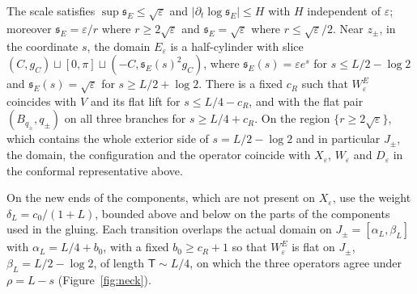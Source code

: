 \documentclass[11pt]{amsart}
\theoremstyle{definition}
\theoremstyle{remark}
\theoremstyle{plain}
\numberwithin{equation}{section}
\newcommand{\eps}{\varepsilon}
\begin{document}
The scale satisfies $\sup{\mathfrak s}_E\le\sqrt\eps$ and $|\partial_t\log{\mathfrak s}_E|\le H$
with $H$ independent of $\eps$; moreover ${\mathfrak s}_E=\eps/r$ where $r\ge2\sqrt\eps$
and ${\mathfrak s}_E=\sqrt\eps$ where $r\le\sqrt\eps/2$. Near $z_\pm$, in the coordinate
$s$, the domain $E_\eps$ is a half-cylinder with slice
$(C,g_C)\sqcup[0,\pi]\sqcup(-C,{\mathfrak s}_E(s)^2g_C)$, where ${\mathfrak s}_E(s)=\eps e^s$ for
$s\le L/2-\log2$ and ${\mathfrak s}_E(s)=\sqrt\eps$ for $s\ge L/2+\log2$. There is a
fixed $c_R$ such that $W^E_\eps$ coincides with $V$ and its flat lift for
$s\le L/4-c_R$, and with the flat pair $(B_{q_\pm},q_\pm)$ on all three branches
for $s\ge L/4+c_R$. On the region $\{r\ge2\sqrt\eps\}$, which contains the whole
exterior side of $s=L/2-\log2$ and in particular $J_\pm$, the domain, the
configuration and the operator coincide with $X_\eps$, $W_\eps$ and $D_\eps$ in the
conformal representative above.

On the new ends of the components, which are not present on $X_\eps$, use the weight $\delta_L=c_0/(1+L)$,
bounded above and below on the parts of the components used in the gluing. Each transition overlaps the
actual domain on $J_\pm=[\alpha_L,\beta_L]$ with $\alpha_L=L/4+b_0$, with a fixed $b_0\ge c_R+1$ so that $W^E_\eps$ is flat on $J_\pm$,
$\beta_L=L/2-\log2$, of length $\mathsf T\sim L/4$, on which the three operators agree
under $\rho=L-s$ (Figure~\ref{fig:neck}).
\end{document}
